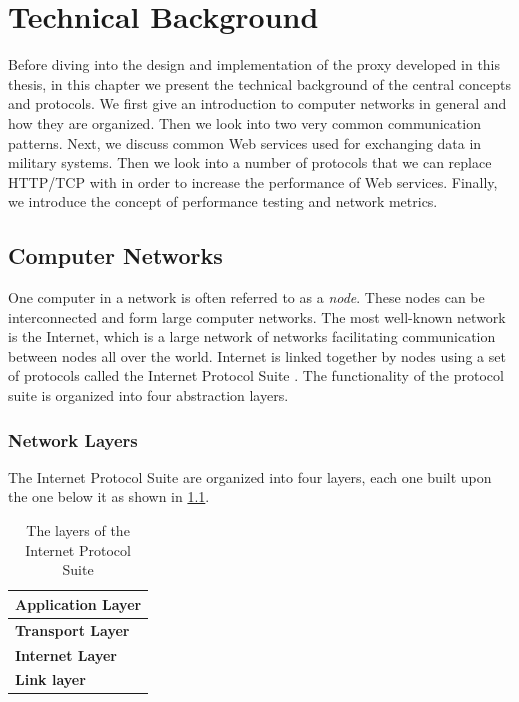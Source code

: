 \chapter{Technical Background}

\label{chapter:background}



Before diving into the design and implementation of the proxy developed in this
thesis, in this chapter we present the technical background of the central
concepts and protocols. We first give an introduction to computer networks in
general and how they are organized. Then we look into two very common
communication patterns. Next, we discuss common Web services used for exchanging
data in military systems. Then we look into a number of protocols that we can
replace HTTP/TCP with in order to increase the performance of Web services.
Finally, we introduce the concept of performance testing and network metrics.

\section{Computer Networks}

One computer in a network is often referred to as a \textit{node}. These nodes
can be interconnected and form large computer networks. The most well-known
network is the Internet, which is a large network of networks facilitating
communication between nodes all over the world. Internet is linked together by
nodes using a set of protocols called the Internet Protocol Suite
\cite{rfc-1122}. The functionality of the protocol suite is organized into four
abstraction layers.

\subsection{Network Layers}

The Internet Protocol Suite are organized into four layers, each one built upon
the one below it as shown in \cref{figure-network-layers}.

\begin{table}[h]
\begin{tabularx}{\textwidth}{| X |}
\hline
  \textbf{Application Layer} \\ \hline
  \textbf{Transport Layer} \\ \hline
  \textbf{Internet Layer} \\ \hline
  \textbf{Link layer} \\ \hline
\end{tabularx}
\caption{The layers of the Internet Protocol Suite}
\label{figure-network-layers}
\end{table}

